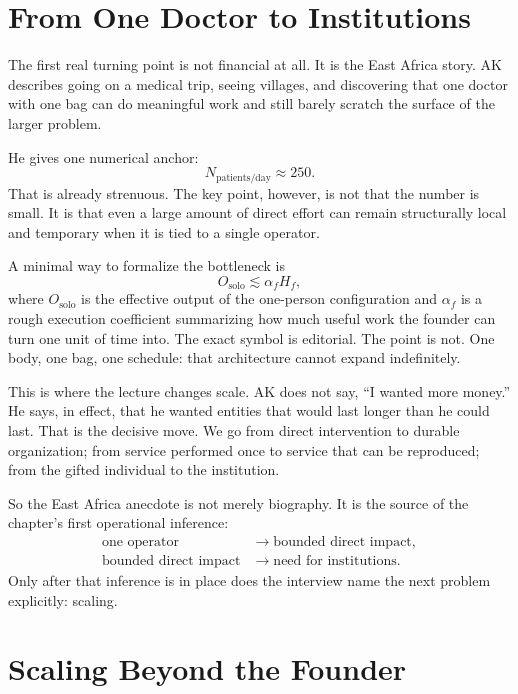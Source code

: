 \section{From One Doctor to Institutions}

The first real turning point is not financial at all. It is the East Africa story. AK describes going on a medical trip, seeing villages, and discovering that one doctor with one bag can do meaningful work and still barely scratch the surface of the larger problem.

He gives one numerical anchor:
\begin{equation}
N_{\text{patients/day}} \approx 250.
\end{equation}
That is already strenuous. The key point, however, is not that the number is small. It is that even a large amount of direct effort can remain structurally local and temporary when it is tied to a single operator.

A minimal way to formalize the bottleneck is
\begin{equation}
O_{\text{solo}} \lesssim \alpha_f H_f,
\end{equation}
where \(O_{\text{solo}}\) is the effective output of the one-person configuration and \(\alpha_f\) is a rough execution coefficient summarizing how much useful work the founder can turn one unit of time into. The exact symbol is editorial. The point is not. One body, one bag, one schedule: that architecture cannot expand indefinitely.

This is where the lecture changes scale. AK does not say, ``I wanted more money.'' He says, in effect, that he wanted entities that would last longer than he could last. That is the decisive move. We go from direct intervention to durable organization; from service performed once to service that can be reproduced; from the gifted individual to the institution.

So the East Africa anecdote is not merely biography. It is the source of the chapter's first operational inference:
\begin{align}
\text{one operator} &\longrightarrow \text{bounded direct impact},\\
\text{bounded direct impact} &\longrightarrow \text{need for institutions}.
\end{align}
Only after that inference is in place does the interview name the next problem explicitly: scaling.

\section{Scaling Beyond the Founder}

